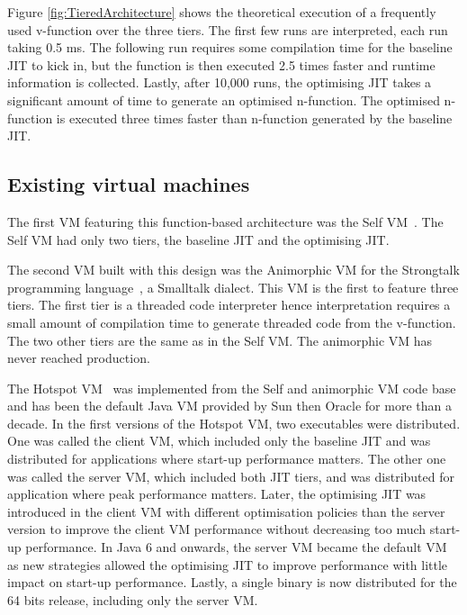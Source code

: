 \documentclass[a4paper,12pt,twoside]{../includes/ThesisStyle}
\begin{document}
Figure \ref{fig:TieredArchitecture} shows the theoretical execution of a frequently used v-function over the three tiers. The first few runs are interpreted, each run taking 0.5 ms. The following run requires some compilation time for the baseline JIT to kick in, but the function is then executed 2.5 times faster and runtime information is collected. Lastly, after 10,000 runs, the optimising JIT takes a significant amount of time to generate an optimised n-function. The optimised n-function is executed three times faster than n-function generated by the baseline JIT.

\subsection{Existing virtual machines}
\label{sec:existing1}

The first VM featuring this function-based architecture was the Self VM~\cite{UrsPHD}. The Self VM had only two tiers, the baseline JIT and the optimising JIT. %

The second VM built with this design was the Animorphic VM for the Strongtalk programming language~\cite{Sun06}, a Smalltalk dialect. This VM is the first to feature three tiers. The first tier is a threaded code interpreter hence interpretation requires a small amount of compilation time to generate threaded code from the v-function. The two other tiers are the same as in the Self VM. The animorphic VM has never reached production.

The Hotspot VM~\cite{Pale01a} was implemented from the Self and animorphic VM code base and has been the default Java VM provided by Sun then Oracle for more than a decade. In the first versions of the Hotspot VM, two executables were distributed. One was called the client VM, which included only the baseline JIT and was distributed for applications where start-up performance matters. The other one was called the server VM, which included both JIT tiers, and was distributed for application where peak performance matters. Later, the optimising JIT was introduced in the client VM with different optimisation policies than the server version to improve the client VM performance without decreasing too much start-up performance. In Java 6 and onwards, the server VM became the default VM as new strategies allowed the optimising JIT to improve performance with little impact on start-up performance. Lastly, a single binary is now distributed for the 64 bits release, including only the server VM. 
\end{document}
